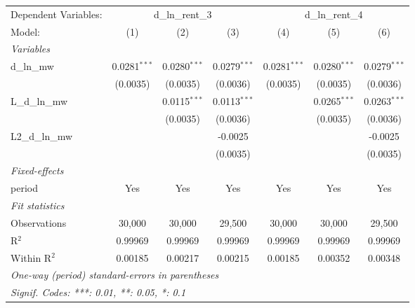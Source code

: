 \begin{tabular}{lcccccc}
\tabularnewline\toprule\toprule
Dependent Variables:&\multicolumn{3}{c}{d\_ln\_rent\_3}&\multicolumn{3}{c}{d\_ln\_rent\_4}\\
Model:&(1) & (2) & (3) & (4) & (5) & (6)\\
\midrule
\emph{Variables}&  & & & & & \\
d\_ln\_mw&0.0281$^{***}$&0.0280$^{***}$&0.0279$^{***}$&0.0281$^{***}$&0.0280$^{***}$&0.0279$^{***}$\\
  &(0.0035)&(0.0035)&(0.0036)&(0.0035)&(0.0035)&(0.0036)\\
L\_d\_ln\_mw&  &0.0115$^{***}$&0.0113$^{***}$&  &0.0265$^{***}$&0.0263$^{***}$\\
  &  &(0.0035)&(0.0036)&  &(0.0035)&(0.0036)\\
L2\_d\_ln\_mw&  &  &-0.0025&  &  &-0.0025\\
  &  &  &(0.0035)&  &  &(0.0035)\\
\midrule
\emph{Fixed-effects}&  & & & & & \\
period&Yes&Yes&Yes&Yes&Yes&Yes\\
\midrule
\emph{Fit statistics}&  & & & & & \\
Observations& 30,000&30,000&29,500&30,000&30,000&29,500\\
R$^2$ & 0.99969&0.99969&0.99969&0.99969&0.99969&0.99969\\
Within R$^2$ & 0.00185&0.00217&0.00215&0.00185&0.00352&0.00348\\
\bottomrule\bottomrule
\multicolumn{7}{l}{\emph{One-way (period) standard-errors in parentheses}}\\
\multicolumn{7}{l}{\emph{Signif. Codes: ***: 0.01, **: 0.05, *: 0.1}}\\
\end{tabular}
